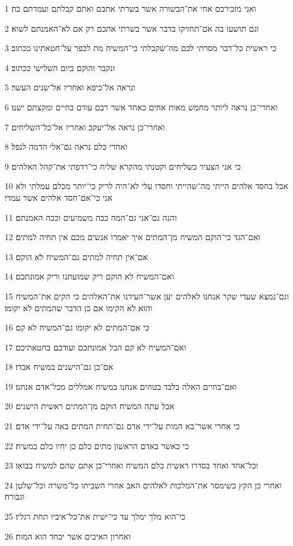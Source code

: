 \par 1 ואני מזכירכם אחי את־הבשורה אשר בשרתי אתכם ואתם קבלתם ועמדתם בה׃
\par 2 וגם תושעו בה אם־תחזיקו בדבר אשר בשרתי אתכם רק אם לא־האמנתם לשוא׃
\par 3 כי ראשית כל־דבר מסרתי לכם מה־שקבלתי כי־המשיח מת לכפר על־חטאתינו ככתוב׃
\par 4 ונקבר והוקם ביום השלישי ככתוב׃
\par 5 ונראה אל־כיפא ואחריו אל־שנים העשר׃
\par 6 ואחרי־כן נראה ליותר מחמש מאות אחים כאחד אשר רבם עודם בחיים ומקצתם ישנו׃
\par 7 ואחרי־כן נראה אל־יעקב ואחריו אל־כל־השליחים׃
\par 8 ואחרי כלם נראה גם־אלי הדמה לנפל׃
\par 9 כי אני הצעיר בשליחים וקטנתי מהקרא שליח כי־רדפתי את־קהל האלהים׃
\par 10 אבל בחסד אלהים הייתי מה־שהייתי וחסדו עלי לא־היה לריק כי־יותר מכלם עמלתי ולא אני כי־אם־חסד אלהים אשר עמדי׃
\par 11 והנה גם־אני גם־המה ככה משמיעים וככה האמנתם׃
\par 12 ואם־הגד כי־הוקם המשיח מן־המתים איך יאמרו אנשים מכם אין תחיה למתים׃
\par 13 אם־אין תחיה למתים גם־המשיח לא הוקם׃
\par 14 ואם־המשיח לא הוקם ריק שמועתנו וריק אמונתכם׃
\par 15 וגם־נמצא שעדי שקר אנחנו לאלהים יען אשר־העידנו את־האלהים כי הקים את־המשיח והוא לא הקימו אם כן הדבר שהמתים לא יקומו׃
\par 16 כי אם־המתים לא יקומו גם־המשיח לא קם׃
\par 17 ואם־המשיח לא קם הבל אמונתכם ועודכם בחטאתיכם׃
\par 18 אם־כן גם־הישנים במשיח אבדו׃
\par 19 ואם־בחיים האלה בלבד בטחים אנחנו במשיח אמללים מכל־אדם אנחנו׃
\par 20 אבל עתה המשיח הוקם מן־המתים ראשית הישנים׃
\par 21 כי אחרי אשר־בא המות על־ידי אדם גם־תחית המתים באה על־ידי אדם׃
\par 22 כי כאשר באדם הראשון מתים כלם כן יחיו כלם במשיח׃
\par 23 וכל־אחד ואחד בסדרו ראשית כלם המשיח ואחרי־כן אתם שהם למשיח בבואו׃
\par 24 ואחרי כן הקץ כשימסר את־המלכות לאלהים האב אחרי השביתו כל־משרה וכל־שלטן וגבורה׃
\par 25 כי־הוא מלך ימלך עד כי־ישית את־כל־איביו תחת רגליו׃
\par 26 ואחרון האיבים אשר יכחד הוא המות׃
